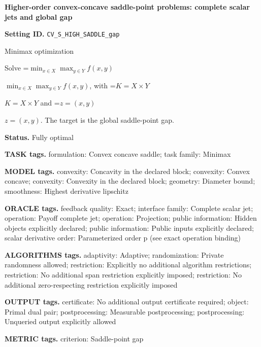 \documentclass[10pt,a4paper]{article}
\newcommand{\AtlasMath}[1]{\par\begingroup\centering\setbox0=\hbox{$\displaystyle #1$}\ifdim\wd0>1.4\linewidth\typeout{ATLAS WIDE FORMULA: \the\wd0}\fi\ifdim\wd0>\linewidth\resizebox{\linewidth}{!}{\box0}\else\box0\fi\par\endgroup}
\newcommand{\AtlasInlineMath}[1]{\begingroup\setbox0=\hbox{$#1$}\ifdim\wd0>.4\linewidth\endgroup\AtlasMath{#1}\else\endgroup$#1$\fi}
\begin{document}
\raggedright

{\LARGE\bfseries\sffamily\color{AtlasNavy} Higher-order convex-concave saddle-point problems: complete scalar jets and global gap\par}\vspace{5pt}


\textbf{Setting ID.} \texttt{CV\_\allowbreak{}S\_\allowbreak{}HIGH\_\allowbreak{}SADDLE\_\allowbreak{}gap}



Minimax optimization



Solve \AtlasInlineMath{\min_{x\in X}\max_{y\in Y}f(x,y)}, with \AtlasInlineMath{K=X\times Y} and \AtlasInlineMath{z=(x,y)}. The target is the global saddle-point gap.



\textbf{Status.} Fully optimal



\textbf{TASK tags.} formulation: Convex concave saddle; task family: Minimax



\textbf{MODEL tags.} convexity: Concavity in the declared block; convexity: Convex concave; convexity: Convexity in the declared block; geometry: Diameter bound; smoothness: Highest derivative lipschitz



\textbf{ORACLE tags.} feedback quality: Exact; interface family: Complete scalar jet; operation: Payoff complete jet; operation: Projection; public information: Hidden objects explicitly declared; public information: Public inputs explicitly declared; scalar derivative order: Parameterized order p (see exact operation binding)



\textbf{ALGORITHMS tags.} adaptivity: Adaptive; randomization: Private randomness allowed; restriction: Explicitly no additional algorithm restrictions; restriction: No additional span restriction explicitly imposed; restriction: No additional zero-respecting restriction explicitly imposed



\textbf{OUTPUT tags.} certificate: No additional output certificate required; object: Primal dual pair; postprocessing: Measurable postprocessing; postprocessing: Unqueried output explicitly allowed



\textbf{METRIC tags.} criterion: Saddle-point gap
\end{document}
